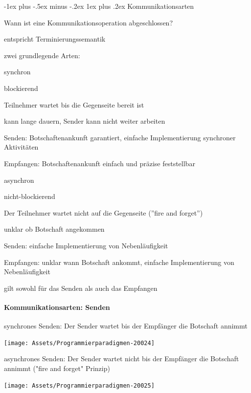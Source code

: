 \documentclass[10pt]{article}
\makeatletter
\renewcommand{\subsubsection}{\@startsection{subsubsection}{3}{0mm}%
                                {-1ex plus -.5ex minus -.2ex}%
                                {1ex plus .2ex}%
                                {\normalfont\small\bfseries}}
\makeatother
\begin{document}
  \subsubsection{Kommunikationsarten}
  \begin{itemize*}
    \item Wann ist eine Kommunikationsoperation abgeschlossen?
    \item entspricht Terminierungssemantik
    \item zwei grundlegende Arten:
    \begin{itemize*}
      \item \color{orange} synchron \color{black}
      \begin{itemize*}
        \item blockierend
        \item Teilnehmer wartet bis die Gegenseite bereit ist
        \item kann lange dauern, Sender kann nicht weiter arbeiten
        \item Senden: Botschaftenankunft garantiert, einfache Implementierung synchroner Aktivitäten
        \item Empfangen: Botschaftenankunft einfach und präzise feststellbar
      \end{itemize*}
      \item \color{orange} asynchron \color{black}
      \begin{itemize*}
        \item nicht-blockierend
        \item Der Teilnehmer wartet nicht auf die Gegenseite (”fire and forget”)
        \item unklar ob Botschaft angekommen
        \item Senden: einfache Implementierung von Nebenläufigkeit
        \item Empfangen: unklar wann Botschaft ankommt, einfache Implementierung von Nebenläufigkeit
      \end{itemize*}
      \item gilt sowohl für das Senden als auch das Empfangen
    \end{itemize*}
  \end{itemize*}
  
  \paragraph{Kommunikationsarten: Senden}
  
  \color{orange} synchrones Senden: \color{black} Der Sender wartet bis der Empfänger die Botschaft annimmt
  \begin{center}
    \centering
    \texttt{[image: Assets/Programmierparadigmen-20024]}
  \end{center}
  \noindent \color{orange} asynchrones Senden: \color{black} Der Sender wartet nicht bis der Empfänger die Botschaft annimmt ("fire and forget" Prinzip)
  \begin{center}
    \centering
    \texttt{[image: Assets/Programmierparadigmen-20025]}
  \end{center}
  
\end{document}
